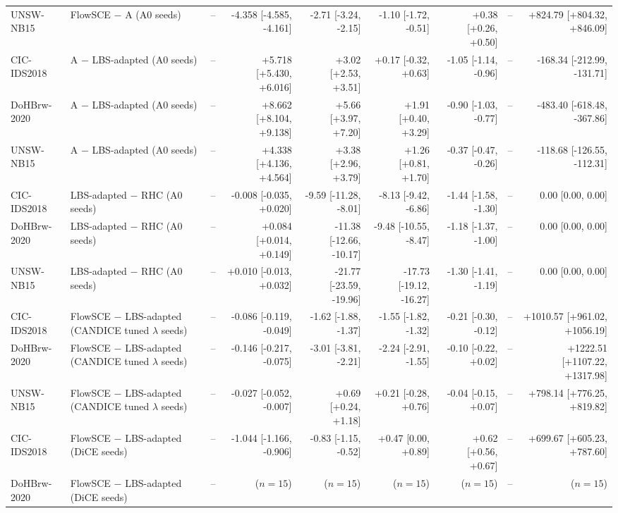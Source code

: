 \begin{table}[t]
\begin{tabular}{@{}llrrrrrrr@{}}
UNSW-NB15 & FlowSCE $-$ A (A0 seeds) & -- & -4.358 [-4.585, -4.161] & -2.71 [-3.24, -2.15] & -1.10 [-1.72, -0.51] & +0.38 [+0.26, +0.50] & -- & +824.79 [+804.32, +846.09] \\
CIC-IDS2018 & A $-$ LBS-adapted (A0 seeds) & -- & +5.718 [+5.430, +6.016] & +3.02 [+2.53, +3.51] & +0.17 [-0.32, +0.63] & -1.05 [-1.14, -0.96] & -- & -168.34 [-212.99, -131.71] \\
DoHBrw-2020 & A $-$ LBS-adapted (A0 seeds) & -- & +8.662 [+8.104, +9.138] & +5.66 [+3.97, +7.20] & +1.91 [+0.40, +3.29] & -0.90 [-1.03, -0.77] & -- & -483.40 [-618.48, -367.86] \\
UNSW-NB15 & A $-$ LBS-adapted (A0 seeds) & -- & +4.338 [+4.136, +4.564] & +3.38 [+2.96, +3.79] & +1.26 [+0.81, +1.70] & -0.37 [-0.47, -0.26] & -- & -118.68 [-126.55, -112.31] \\
CIC-IDS2018 & LBS-adapted $-$ RHC (A0 seeds) & -- & -0.008 [-0.035, +0.020] & -9.59 [-11.28, -8.01] & -8.13 [-9.42, -6.86] & -1.44 [-1.58, -1.30] & -- & 0.00 [0.00, 0.00] \\
DoHBrw-2020 & LBS-adapted $-$ RHC (A0 seeds) & -- & +0.084 [+0.014, +0.149] & -11.38 [-12.66, -10.17] & -9.48 [-10.55, -8.47] & -1.18 [-1.37, -1.00] & -- & 0.00 [0.00, 0.00] \\
UNSW-NB15 & LBS-adapted $-$ RHC (A0 seeds) & -- & +0.010 [-0.013, +0.032] & -21.77 [-23.59, -19.96] & -17.73 [-19.12, -16.27] & -1.30 [-1.41, -1.19] & -- & 0.00 [0.00, 0.00] \\
CIC-IDS2018 & FlowSCE $-$ LBS-adapted (CANDICE tuned $\lambda$ seeds) & -- & -0.086 [-0.119, -0.049] & -1.62 [-1.88, -1.37] & -1.55 [-1.82, -1.32] & -0.21 [-0.30, -0.12] & -- & +1010.57 [+961.02, +1056.19] \\
DoHBrw-2020 & FlowSCE $-$ LBS-adapted (CANDICE tuned $\lambda$ seeds) & -- & -0.146 [-0.217, -0.075] & -3.01 [-3.81, -2.21] & -2.24 [-2.91, -1.55] & -0.10 [-0.22, +0.02] & -- & +1222.51 [+1107.22, +1317.98] \\
UNSW-NB15 & FlowSCE $-$ LBS-adapted (CANDICE tuned $\lambda$ seeds) & -- & -0.027 [-0.052, -0.007] & +0.69 [+0.24, +1.18] & +0.21 [-0.28, +0.76] & -0.04 [-0.15, +0.07] & -- & +798.14 [+776.25, +819.82] \\
CIC-IDS2018 & FlowSCE $-$ LBS-adapted (DiCE seeds) & -- & -1.044 [-1.166, -0.906] & -0.83 [-1.15, -0.52] & +0.47 [0.00, +0.89] & +0.62 [+0.56, +0.67] & -- & +699.67 [+605.23, +787.60] \\
DoHBrw-2020 & FlowSCE $-$ LBS-adapted (DiCE seeds) & -- & ($n=15$) & ($n=15$) & ($n=15$) & ($n=15$) & -- & ($n=15$) \\

\end{tabular}
\end{table}
